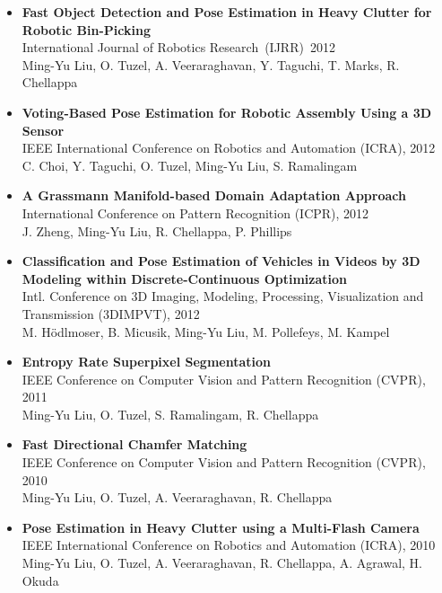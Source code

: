 \documentclass[10pt,letterpaper]{article}
\begin{document}
\begin{itemize}
\item           {\bf Fast Object Detection and Pose Estimation in Heavy Clutter for Robotic Bin-Picking}\\
                International Journal of Robotics Research~(IJRR)~2012\\
                {Ming-Yu Liu}, O. Tuzel, A. Veeraraghavan, Y. Taguchi, T. Marks, R. Chellappa\vspace{-2mm}

\item           {\bf Voting-Based Pose Estimation for Robotic Assembly Using a 3D Sensor}\\
                IEEE International Conference on Robotics and Automation (ICRA), 2012\\
                C. Choi, Y. Taguchi, O. Tuzel, {Ming-Yu Liu}, S. Ramalingam\vspace{-2mm}

\item           {\bf A Grassmann Manifold-based Domain Adaptation Approach}\\
                International Conference on Pattern Recognition (ICPR), 2012\\
                J. Zheng, {Ming-Yu Liu}, R. Chellappa, P. Phillips\vspace{-2mm}

\item           {\bf Classification and Pose Estimation of Vehicles in Videos by 3D Modeling within Discrete-Continuous Optimization}\\
                Intl. Conference on 3D Imaging, Modeling, Processing, Visualization and Transmission (3DIMPVT), 2012\\
                M. Hödlmoser, B. Micusik, {Ming-Yu Liu}, M. Pollefeys, M. Kampel\vspace{-2mm}

\item           {\bf Entropy Rate Superpixel Segmentation}\\
                IEEE Conference on Computer Vision and Pattern Recognition (CVPR), 2011\\
                {Ming-Yu Liu}, O. Tuzel, S. Ramalingam, R. Chellappa\vspace{-2mm}

\item           {\bf Fast Directional Chamfer Matching}\\
                IEEE Conference on Computer Vision and Pattern Recognition (CVPR), 2010\\
                {Ming-Yu Liu}, O. Tuzel, A. Veeraraghavan, R. Chellappa\vspace{-2mm}

\item           {\bf Pose Estimation in Heavy Clutter using a Multi-Flash Camera}\\
                IEEE International Conference on Robotics and Automation (ICRA), 2010\\
                {Ming-Yu Liu}, O. Tuzel, A. Veeraraghavan, R. Chellappa, A. Agrawal, H. Okuda
\end{itemize}
\end{document}
